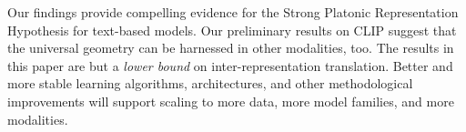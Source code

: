 
Our findings provide compelling evidence for the Strong Platonic Representation Hypothesis for text-based models.  Our preliminary results on CLIP suggest that the universal geometry can be harnessed in other modalities, too.  The results in this paper are but a \emph{lower bound} on inter-representation translation.  Better and more stable learning algorithms, architectures, and other methodological improvements will support scaling to more data, more model families, and more modalities.

